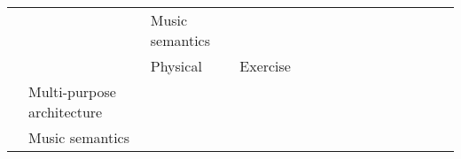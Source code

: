 \begin{tabular}{p{1.5cm}p{1.5cm}p{1.5cm}p{1.5cm}p{0.6cm}p{0.6cm}p{0.6cm}p{0.6cm}p{0.6cm}p{0.6cm}p{0.6cm}p{0.6cm}p{0.6cm}p{0.6cm}p{0.6cm}}
                                &                 & Music semantics &   &                                                             &                                                                                                           \cite{Stober2014} &                                                                        &                  &                                      &                                                            &                      &                       &                                 &                         &                                                                      \\
                                &                 & Physical & Exercise &                                                             &                                                                                                            \cite{Ghosh2018} &                                                                        &                  &                                      &                                                            &                      &  \cite{Gordienko2017} &                                 &                         &                                                                      \\
                                & Multi-purpose architecture &   &   &                                             \cite{Lee2018a} &                                                                                                           \cite{Zhang2018a} &                                                                        &                  &                                      &                                                            &                      &                       &                \cite{Deiss2018} &                         &                                                                      \\
                                & Music semantics &   &   &                                                             &                                                                                                           \cite{Raposo2017} &                                                                        &                  &                                      &                                                            &                      &                       &                                 &                         &                                                                      \\

\end{tabular}
